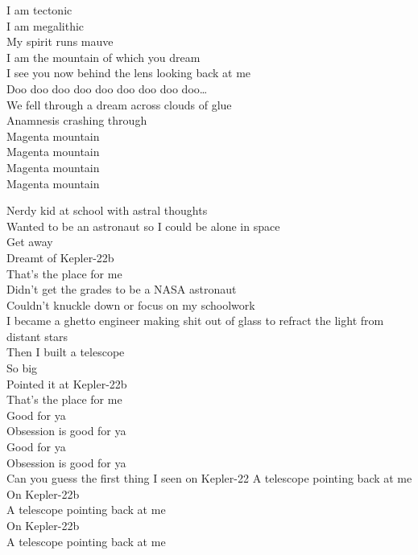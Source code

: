I am tectonic\\
I am megalithic\\
My spirit runs mauve\\
I am the mountain of which you dream\\
I see you now behind the lens looking back at me\\

Doo doo doo doo doo doo doo doo doo…\\
We fell through a dream across clouds of glue\\
Anamnesis crashing through\\

Magenta mountain\\
Magenta mountain\\
Magenta mountain\\
Magenta mountain\\




Nerdy kid at school with astral thoughts\\
Wanted to be an astronaut so I could be alone in space\\

Get away\\
Dreamt of Kepler-22b\\
That's the place for me\\

Didn't get the grades to be a NASA astronaut\\
Couldn't knuckle down or focus on my schoolwork\\
I became a ghetto engineer making shit out of glass to refract the light from distant stars\\
Then I built a telescope\\
So big\\
Pointed it at Kepler-22b\\
That's the place for me\\

Good for ya\\
Obsession is good for ya\\
Good for ya\\
Obsession is good for ya\\

Can you guess the first thing I seen on Kepler-22
A telescope pointing back at me\\
On Kepler-22b\\
A telescope pointing back at me\\
On Kepler-22b\\
A telescope pointing back at me\\

